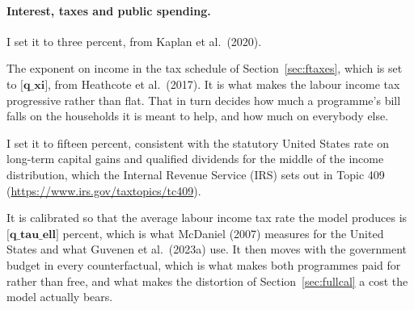 \documentclass[10pt]{article}
\begin{document}
\paragraph{Interest, taxes and public spending.}
\begin{description}\setlength{\itemsep}{0.25em}\setlength{\parskip}{0em}
\item[$r$, the risk-free rate.] I set it to three percent, from Kaplan et al.\
(2020).

\item[$\xi$, tax progressivity.] The exponent on income in the tax schedule of
Section~\ref{sec:ftaxes}, which is set to $\textbf{[q_xi]}$, from Heathcote et al.\ (2017). It is
what makes the labour income tax progressive rather than flat. That in turn decides
how much a programme's bill falls on the households it is meant to help, and how much
on everybody else.

\item[$\tau_k$, the capital income tax.] I set it to fifteen percent, consistent
with the statutory United States rate on long-term capital gains and qualified
dividends for the middle of the income distribution, which the Internal Revenue
Service (IRS) sets out in Topic 409
(\url{https://www.irs.gov/taxtopics/tc409}).

\item[$\tau_{\ell}$, the level of the labour income tax.] It is calibrated so that
the average labour income tax rate the model produces is $\textbf{[q_tau_ell]}$ percent, which is
what McDaniel (2007) measures for the United States and what Guvenen et al.\ (2023a)
use. It then moves with the government budget in every counterfactual, which is what
makes both programmes paid for rather than free, and what makes the distortion of
Section~\ref{sec:fullcal} a cost the model actually bears.

\end{description}
\end{document}
